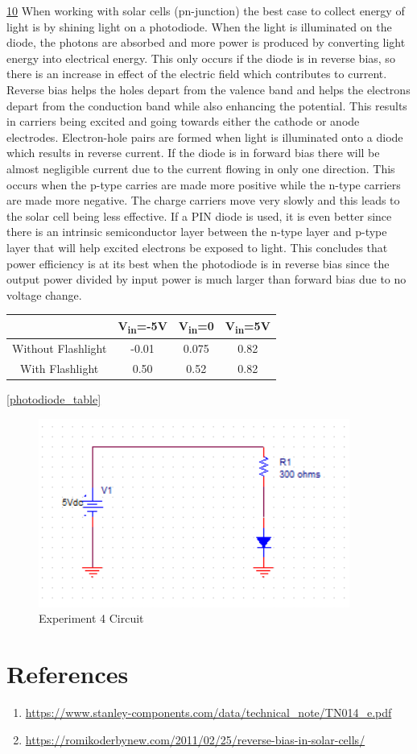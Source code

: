 \underline{10}
When working with solar cells (pn-junction) the best case to collect energy of light is by shining light on a photodiode. When the light is illuminated on the diode, the photons are absorbed and more power is produced by converting light energy into electrical energy. This only occurs if the diode is in reverse bias, so there is an increase in effect of the electric field which contributes to current. Reverse bias helps the holes depart from the valence band and helps the electrons depart from the conduction band while also enhancing the potential. This results in carriers being excited and going towards either the cathode or anode electrodes. Electron-hole pairs are formed when light is illuminated onto a diode which results in reverse current. If the diode is in forward bias there will be almost negligible current due to the current flowing in only one direction. This occurs when the p-type carries are made more positive while the n-type carriers are made more negative. The charge carriers move very slowly and this leads to the solar cell being less effective. If a PIN diode is used, it is even better since there is an intrinsic semiconductor layer between the n-type layer and p-type layer that will help excited electrons be exposed to light. This concludes that power efficiency is at its best when the photodiode is in reverse bias since the output power divided by input power is much larger than forward bias due to no voltage change.\\
\begin{table}
	\centering
	\begin{tabular}{| c | c | c | c |}\hline
		& V\textsubscript{in}=-5V & V\textsubscript{in}=0 & V\textsubscript{in}=5V \\\hline
		Without Flashlight & -0.01 & 0.075 & 0.82\\\hline
		With Flashlight & 0.50 & 0.52 & 0.82 \\\hline
	\end{tabular}
\label{Voltage over Photodiode}
\ref{photodiode_table}
\end{table}

\begin{figure}[h!]
	\centering
	\includegraphics{CircuitSchematic.PNG}
	\caption{Experiment 4 Circuit}
	\label{fig:Circuit_Pic}
\end{figure}

\section{References}
\scriptsize{
	\begin{enumerate}
		\item \url{https://www.stanley-components.com/data/technical_note/TN014_e.pdf}
		\item \url{https://romikoderbynew.com/2011/02/25/reverse-bias-in-solar-cells/}
	\end{enumerate}
}

